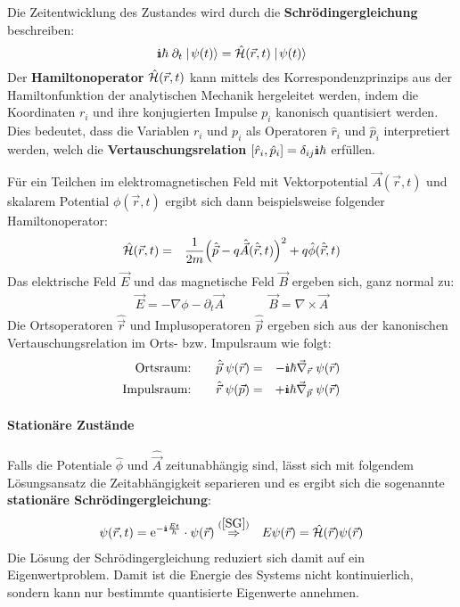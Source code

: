Die Zeitentwicklung des Zustandes wird durch die {\bf Schrödingergleichung} beschreiben: 
\begin{equation}
	\I \hbar\; \partial_t \ket{\psi(t)} = \hat{\ham}(\vec{r},t) \ket{\psi(t)}	\label{SG}
\end{equation}
Der {\bf Hamiltonoperator} $\hat{\mathcal H}(\vec{r},t)$ kann mittels des Korrespondenzprinzips aus der Hamiltonfunktion der analytischen Mechanik hergeleitet werden, indem die Koordinaten $r_i$ und ihre konjugierten Impulse $p_i$ kanonisch quantisiert werden. Dies bedeutet, dass die Variablen $r_i$ und $p_i$ als Operatoren $\hat{r}_i$ und $\hat{p}_i$ interpretiert werden, welch die {\bf Vertauschungsrelation} $[\hat{r}_i,\hat{p}_i]=\delta_{ij}\I\hbar$ erfüllen. 

Für ein Teilchen im elektromagnetischen Feld mit Vektorpotential $\vec{ A}(\vec{r},t)$ und skalarem Potential $\phi(\vec{r},t)$ ergibt sich dann beispielsweise folgender Hamiltonoperator:
\begin{eqnarray*}
	\hat{\mathcal H}(\vec{r},t) &=& \frac1{2m} \Big( \hat{\vec{p}} - q\hat{\vec{A}}(\hat{\vec{r}},t)\Big)^2 + q\hat{\phi}(\hat{\vec{r}},t)
\end{eqnarray*}
Das elektrische Feld $\vec{E}$ und das magnetische Feld $\vec{B}$ ergeben sich, ganz normal zu: 
\begin{eqnarray*}
	\vec{E} = -\nabla\phi - \partial_t\vec{A} &\qquad& \vec{B} = \nabla \times \vec{A}
\end{eqnarray*}
Die Ortsoperatoren $\hat{\vec{r}}$ und Implusoperatoren $\hat{\vec{p}}$ ergeben sich aus der kanonischen Vertauschungsrelation im Orts- bzw. Impulsraum wie folgt: 
\begin{eqnarray*}
	\text{Ortsraum:}\qquad \hat{\vec{p}} \;\psi(\vec{r}) &=& -\I\hbar \vec \nabla_{\vec{r}}\;\psi(\vec{r})
	\\
	\text{Impulsraum:}\qquad \hat{\vec{r}} \;\psi(\vec{p}) &=& +\I\hbar \vec \nabla_{\vec{p}}\;\psi(\vec{r})
\end{eqnarray*}

\paragraph{Stationäre Zustände}
Falls die Potentiale $\hat{\phi}$ und $\hat{\vec{A}}$ zeitunabhängig sind, lässt sich mit folgendem Lösungsansatz die Zeitabhängigkeit separieren und es ergibt sich die sogenannte {\bf stationäre Schrödingergleichung}: 
\begin{eqnarray}
	\psi(\vec{r},t) = \e^{-\I\frac{E t}{\hbar}} \cdot \psi(\vec{r}) &\overset{(\ref{SG})}{\Rightarrow}& E \psi(\vec{r}) = \hat{\ham}(\vec{r})\psi(\vec{r}) \label{statSG}
\end{eqnarray}
Die Lösung der Schrödingergleichung reduziert sich damit auf ein Eigenwertproblem. Damit ist die Energie des Systems nicht kontinuierlich, sondern kann nur bestimmte quantisierte Eigenwerte annehmen. 

